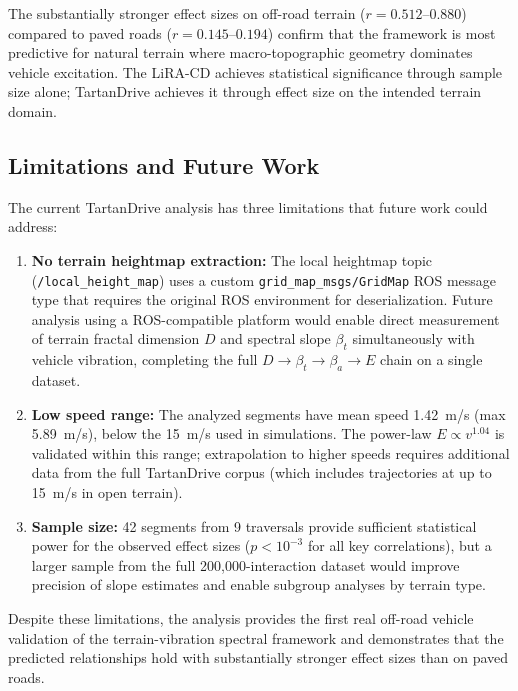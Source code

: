 \documentclass[11pt]{article}
\begin{document}
The substantially stronger effect sizes on off-road terrain ($r = 0.512$--$0.880$) compared to paved roads ($r = 0.145$--$0.194$) confirm that the framework is most predictive for natural terrain where macro-topographic geometry dominates vehicle excitation. The LiRA-CD achieves statistical significance through sample size alone; TartanDrive achieves it through effect size on the intended terrain domain.

\subsection{Limitations and Future Work}

The current TartanDrive analysis has three limitations that future work could address:

\begin{enumerate}
\item \textbf{No terrain heightmap extraction:} The local heightmap topic (\texttt{/local\_height\_map}) uses a custom \texttt{grid\_map\_msgs/GridMap} ROS message type that requires the original ROS environment for deserialization. Future analysis using a ROS-compatible platform would enable direct measurement of terrain fractal dimension $D$ and spectral slope $\beta_t$ simultaneously with vehicle vibration, completing the full $D \rightarrow \beta_t \rightarrow \beta_a \rightarrow E$ chain on a single dataset.

\item \textbf{Low speed range:} The analyzed segments have mean speed 1.42~m/s (max 5.89~m/s), below the 15~m/s used in simulations. The power-law $E \propto v^{1.04}$ is validated within this range; extrapolation to higher speeds requires additional data from the full TartanDrive corpus (which includes trajectories at up to 15~m/s in open terrain).

\item \textbf{Sample size:} 42 segments from 9 traversals provide sufficient statistical power for the observed effect sizes ($p < 10^{-3}$ for all key correlations), but a larger sample from the full 200,000-interaction dataset would improve precision of slope estimates and enable subgroup analyses by terrain type.
\end{enumerate}

\noindent Despite these limitations, the analysis provides the first real off-road vehicle validation of the terrain-vibration spectral framework and demonstrates that the predicted relationships hold with substantially stronger effect sizes than on paved roads.
\end{document}
